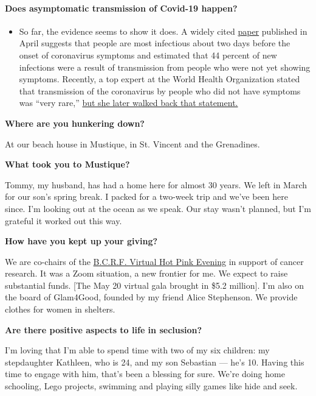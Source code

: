 \begin{itemize}
{  \paragraph{Does asymptomatic transmission of Covid-19
  happen?}\label{does-asymptomatic-transmission-of-covid-19-happen}}

  \begin{itemize}
  \tightlist
  \item
    So far, the evidence seems to show it does. A widely cited
    \href{https://www.nature.com/articles/s41591-020-0869-5}{paper}
    published in April suggests that people are most infectious about
    two days before the onset of coronavirus symptoms and estimated that
    44 percent of new infections were a result of transmission from
    people who were not yet showing symptoms. Recently, a top expert at
    the World Health Organization stated that transmission of the
    coronavirus by people who did not have symptoms was ``very rare,''
    \href{https://www.nytimes3xbfgragh.onion/2020/06/09/world/coronavirus-updates.html?action=click\&pgtype=Article\&state=default\&region=MAIN_CONTENT_3\&context=storylines_faq\#link-1f302e21}{but
    she later walked back that statement.}
  \end{itemize}
\end{itemize}

\textbf{Where are you hunkering down?}

At our beach house in Mustique, in St. Vincent and the Grenadines.

\textbf{What took you to Mustique?}

Tommy, my husband, has had a home here for almost 30 years. We left in
March for our son's spring break. I packed for a two-week trip and we've
been here since. I'm looking out at the ocean as we speak. Our stay
wasn't planned, but I'm grateful it worked out this way.

\textbf{How have you kept up your giving?}

We are co-chairs of the \href{https://www.bcrf.org}{B.C.R.F. Virtual Hot
Pink Evening} in support of cancer research. It was a Zoom situation, a
new frontier for me. We expect to raise substantial funds. {[}The May 20
virtual gala brought in \$5.2 million{]}. I'm also on the board of
Glam4Good, founded by my friend Alice Stephenson. We provide clothes for
women in shelters.

\textbf{Are there positive aspects to life in seclusion?}

I'm loving that I'm able to spend time with two of my six children: my
stepdaughter Kathleen, who is 24, and my son Sebastian --- he's 10.
Having this time to engage with him, that's been a blessing for sure.
We're doing home schooling, Lego projects, swimming and playing silly
games like hide and seek.

